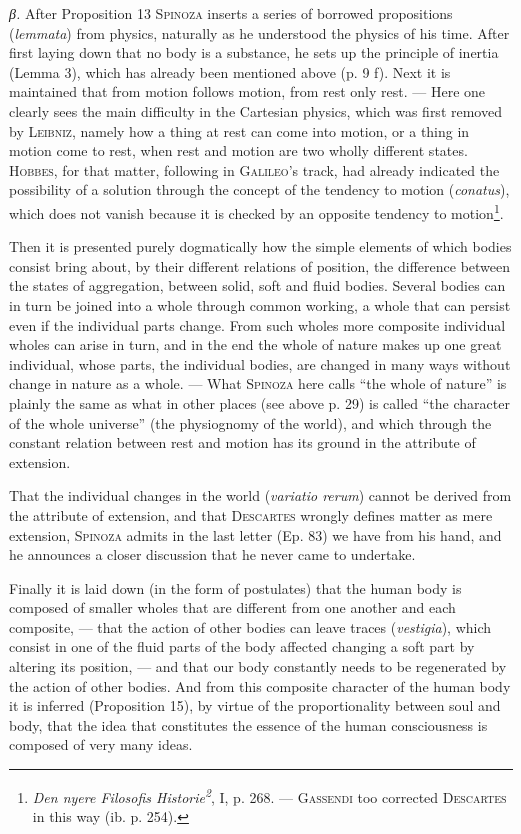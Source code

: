 \documentclass[12pt]{article}
\newcommand{\opage}[1]{\marginnote{\footnotesize\textit{[#1]}}}
\begin{document}
\textit{β.} After Proposition 13 \textsc{Spinoza} inserts a series of borrowed propositions
(\textit{lemmata}) \opage{43}from physics, naturally as he understood the physics of his
time. After first laying down that no body is a substance, he sets up the principle of
inertia (Lemma 3), which has already been mentioned above (p. 9 f). Next it is maintained
that from motion follows motion, from rest only rest. --- Here one clearly sees the main
difficulty in the Cartesian physics, which was first removed by \textsc{Leibniz}, namely how
a thing at rest can come into motion, or a thing in motion come to rest, when rest and motion
are two wholly different states. \textsc{Hobbes}, for that matter, following in
\textsc{Galileo}'s track, had already indicated the possibility of a solution through the
concept of the tendency to motion (\textit{conatus}), which does not vanish because it is
checked by an opposite tendency to motion\footnote{\textit{Den nyere Filosofis
Historie\textsuperscript{2}}, I, p. 268. --- \textsc{Gassendi} too corrected
\textsc{Descartes} in this way (ib. p. 254).}.

Then it is presented purely dogmatically how the simple elements of which bodies consist
bring about, by their different relations of position, the difference between the states of
aggregation, between solid, soft and fluid bodies. Several bodies can in turn be joined into
a whole through common working, a whole that can persist even if the individual parts
change. From such wholes more composite individual wholes can arise in turn, and in the end
the whole of nature makes up one great individual, whose parts, the individual bodies, are
changed in many ways without change in nature as a whole. --- What \textsc{Spinoza} here
calls ``the whole of nature'' is plainly the same as what in other places (see above p. 29)
is called ``the character of the whole universe'' (the physiognomy of the world), and which
through the constant relation between rest and motion has its ground in the attribute of
extension.

That the individual changes in the world (\textit{variatio rerum}) cannot be derived from
the attribute of extension, and that \textsc{Descartes} wrongly defines matter as mere
extension, \textsc{Spinoza} admits in the last letter (Ep. 83) we have from his hand, and he
announces a closer discussion that he never came to undertake.

Finally it is laid down (in the form of postulates) that the human body is composed of
smaller wholes that are different from one another and each composite, --- that the action
of other bodies can leave traces (\textit{vestigia}), which consist in one of the fluid
parts of the body affected changing a soft part by altering its position, --- and that our
body constantly needs to be regenerated by the action of other bodies. And from this
composite character of the human body it is inferred (Proposition 15), by virtue of the
proportionality between soul and body, that the idea that constitutes the essence of the
human consciousness is composed of very many ideas.
\end{document}
